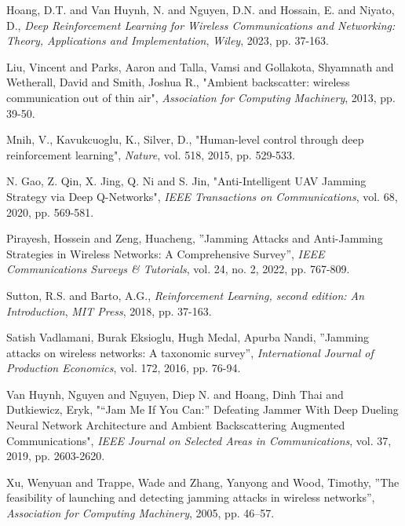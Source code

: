 \documentclass{uetgraduation}
\begin{document}
\begin{thebibliography}{9}
\begin{bibsection}{}
    Hoang, D.T. and Van Huynh, N. and Nguyen, D.N. and Hossain, E. and Niyato, D.,
    \textit{Deep Reinforcement Learning for Wireless Communications and Networking: Theory, Applications and Implementation},
    \textit{Wiley}, 
    2023, 
    pp. 37-163.

    Liu, Vincent and Parks, Aaron and Talla, Vamsi and Gollakota, Shyamnath and Wetherall, David and Smith, Joshua R.,
    "Ambient backscatter: wireless communication out of thin air",
    \textit{Association for Computing Machinery},
    2013,
    pp. 39-50.

    Mnih, V., Kavukcuoglu, K., Silver, D.,
    "Human-level control through deep reinforcement learning",
    \textit{Nature},
    vol. 518,
    2015,
    pp. 529-533.

    N. Gao, Z. Qin, X. Jing, Q. Ni and S. Jin,
    "Anti-Intelligent UAV Jamming Strategy via Deep Q-Networks",
    \textit{IEEE Transactions on Communications},
    vol. 68,
    2020,
    pp. 569-581.

    Pirayesh, Hossein and Zeng, Huacheng,
    ''Jamming Attacks and Anti-Jamming Strategies in Wireless Networks: A Comprehensive Survey'',
    \textit{IEEE Communications Surveys \& Tutorials},
    vol. 24, no. 2,
    2022,
    pp. 767-809.

    Sutton, R.S. and Barto, A.G.,
    \textit{Reinforcement Learning, second edition: An Introduction},
    \textit{MIT Press}, 
    2018, 
    pp. 37-163.

    Satish Vadlamani, Burak Eksioglu, Hugh Medal, Apurba Nandi,
    ''Jamming attacks on wireless networks: A taxonomic survey'',
    \textit{International Journal of Production Economics},
    vol. 172,
    2016,
    pp. 76-94.

    Van Huynh, Nguyen and Nguyen, Diep N. and Hoang, Dinh Thai and Dutkiewicz, Eryk,
    "“Jam Me If You Can:” Defeating Jammer With Deep Dueling Neural Network Architecture and Ambient Backscattering Augmented Communications",
    \textit{IEEE Journal on Selected Areas in Communications},
    vol. 37,
    2019,
    pp. 2603-2620.

    Xu, Wenyuan and Trappe, Wade and Zhang, Yanyong and Wood, Timothy,
    ''The feasibility of launching and detecting jamming attacks in wireless networks'',
    \textit{Association for Computing Machinery},
    2005,
    pp. 46–57.

\end{bibsection}
\end{thebibliography}
\end{document}
